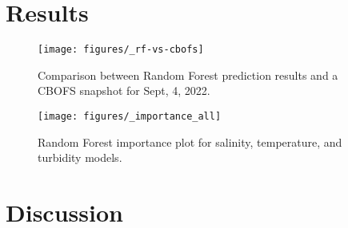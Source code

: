 \documentclass{article}
\begin{document}
\section{Results}

\begin{figure}[ht!]
    \begin{center}
          \texttt{[image: figures/\_rf-vs-cbofs]}
          \caption{Comparison between Random Forest prediction results and a CBOFS snapshot for Sept, 4, 2022.}
    \end{center}    
\end{figure}

\begin{figure}[ht!]
    \begin{center}
          \texttt{[image: figures/\_importance\_all]}
          \caption{Random Forest importance plot for salinity, temperature, and turbidity models.}
    \end{center}    
\end{figure}

\section{Discussion}



\end{document}
